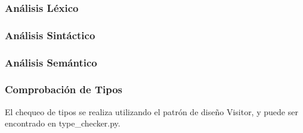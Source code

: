 \documentclass[10pt]{article} %
\begin{document}
	\subsubsection{An\'alisis L\'exico}
	
	\subsubsection{An\'alisis Sint\'actico}
	
	\subsubsection{An\'alisis Sem\'antico}
	
	\subsubsection{Comprobaci\'on de Tipos}
	
	El chequeo de tipos se realiza utilizando el patrón de diseño Visitor, y puede ser encontrado en type\_checker.py.
	
\end{document}
